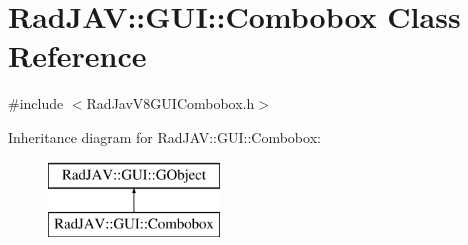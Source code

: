 \hypertarget{class_rad_j_a_v_1_1_g_u_i_1_1_combobox}{}\section{Rad\+J\+AV\+:\+:G\+UI\+:\+:Combobox Class Reference}
\label{class_rad_j_a_v_1_1_g_u_i_1_1_combobox}


{\ttfamily \#include $<$Rad\+Jav\+V8\+G\+U\+I\+Combobox.\+h$>$}

Inheritance diagram for Rad\+J\+AV\+:\+:G\+UI\+:\+:Combobox\+:\begin{figure}[H]
\begin{center}
\leavevmode
\includegraphics[height=2.000000cm]{class_rad_j_a_v_1_1_g_u_i_1_1_combobox}
\end{center}
\end{figure}
